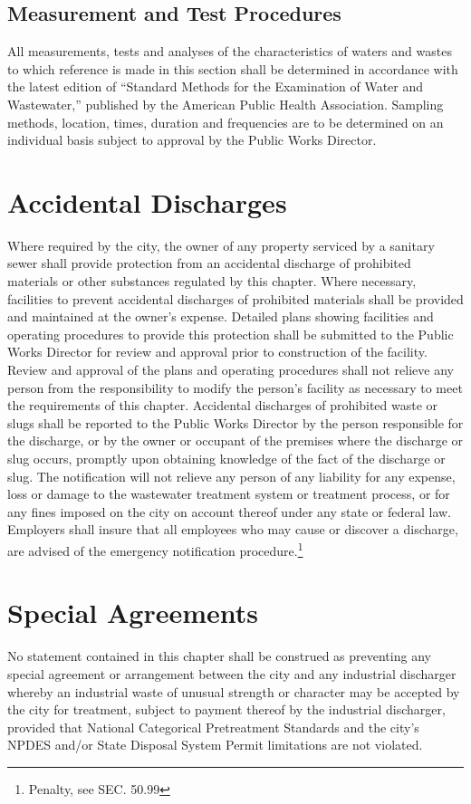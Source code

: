 \subsection{Measurement and Test Procedures}
All measurements, tests and analyses of the characteristics of waters and wastes to which reference is made in this section shall be determined in accordance with the latest edition of “Standard Methods for the Examination of Water and Wastewater,” published by the American Public Health Association.  Sampling methods, location, times, duration and frequencies are to be determined on an individual basis subject to approval by the Public Works Director.

\section{Accidental Discharges}
Where required by the city, the owner of any property serviced by a sanitary sewer shall provide protection from an accidental discharge of prohibited materials or other substances regulated by this chapter.  Where necessary, facilities to prevent accidental discharges of prohibited materials shall be provided and maintained at the owner’s expense.  Detailed plans showing facilities and operating procedures to provide this protection shall be submitted to the Public Works Director for review and approval prior to construction of the facility.  Review and approval of the plans and operating procedures shall not relieve any person from the responsibility to modify the person’s facility as necessary to meet the requirements of this chapter.  Accidental discharges of prohibited waste or slugs shall be reported to the Public Works Director by the person responsible for the discharge, or by the owner or occupant of the premises where the discharge or slug occurs, promptly upon obtaining knowledge of the fact of the discharge or slug.  The notification will not relieve any person of any liability for any expense, loss or damage to the wastewater treatment system or treatment process, or for any fines imposed on the city on account thereof under any state or federal law.  Employers shall insure that all employees who may cause or discover a discharge, are advised of the emergency notification procedure.\footnote{Penalty, see SEC. 50.99}

\section{Special Agreements}
No statement contained in this chapter shall be construed as preventing any special agreement or arrangement between the city and any industrial discharger whereby an industrial waste of unusual strength or character may be accepted by the city for treatment, subject to payment thereof by the industrial discharger, provided that National Categorical Pretreatment Standards and the city’s NPDES and/or State Disposal System Permit limitations are not violated.

